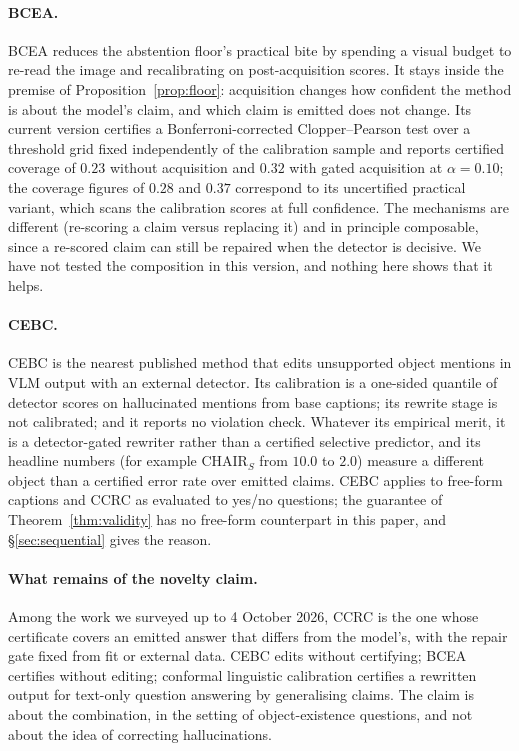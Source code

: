 \paragraph{BCEA.}
BCEA reduces the abstention floor's practical bite by spending a visual budget to re-read the image and
recalibrating on post-acquisition scores. It stays inside the premise of Proposition~\ref{prop:floor}: acquisition changes how confident the
method is about the model's claim, and which claim is emitted does not change. Its current version certifies a
Bonferroni-corrected Clopper--Pearson test over a threshold grid fixed independently of the calibration sample and
reports certified coverage of $0.23$ without acquisition and $0.32$ with gated acquisition at $\alpha=0.10$; the
coverage figures of $0.28$ and $0.37$ correspond to its uncertified practical variant, which scans the calibration
scores at full confidence. The mechanisms are different (re-scoring a claim versus replacing it) and in principle
composable, since a re-scored claim can still be repaired when the detector is decisive. We have not tested
the composition in this version, and nothing here shows that it helps.

\paragraph{CEBC.}
CEBC is the nearest published method that edits unsupported object mentions in VLM output with an external detector.
Its calibration is a one-sided quantile of detector scores on hallucinated mentions from base captions; its rewrite stage
is not calibrated; and it reports no violation check. Whatever its empirical merit, it is a detector-gated rewriter rather than a certified
selective predictor, and its headline numbers (for example CHAIR$_S$ from $10.0$ to $2.0$) measure a different object
than a certified error rate over emitted claims. CEBC applies to free-form captions and CCRC as evaluated to
yes/no questions; the guarantee of Theorem~\ref{thm:validity} has no free-form counterpart in this paper, and
\S\ref{sec:sequential} gives the reason.

\paragraph{What remains of the novelty claim.}
Among the work we surveyed up to 4 October 2026, CCRC is the one whose certificate covers an emitted answer
that differs from the model's, with the repair gate fixed from fit or external data. CEBC edits without certifying;
BCEA certifies without editing; conformal linguistic calibration \citep{jiang2025clc} certifies a rewritten output
for text-only question answering by generalising claims. The claim is about the combination, in the setting of
object-existence questions, and not about the idea of correcting hallucinations.

